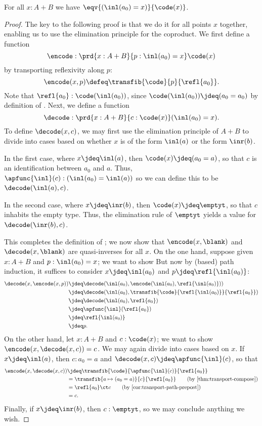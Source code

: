 \begin{thm}\label{thm:path-coprod}
  For all $x:A+B$ we have $\eqv{(\inl(a_0)=x)}{\code(x)}$.
\end{thm}
\begin{proof}
  The key to the following proof is that we do it for all points $x$ together, enabling us to use the elimination principle for the coproduct.
  We first define a function
  \[ \encode : \prd{x:A+B}{p:\inl(a_0)=x} \code(x) \]
  by transporting reflexivity along $p$:
  \[ \encode(x,p) \defeq \transfib{\code}{p}{\refl{a_0}}. \]
  Note that $\refl{a_0} : \code(\inl(a_0))$, since $\code(\inl(a_0))\jdeq (a_0=a_0)$ by definition of \code.
  Next, we define a function
  \[ \decode : \prd{x:A+B}{c:\code(x)} (\inl(a_0)=x). \]
  To define $\decode(x,c)$, we may first use the elimination principle of $A+B$ to divide into cases based on whether $x$ is of the form $\inl(a)$ or the form $\inr(b)$.

  In the first case, where $x\jdeq \inl(a)$, then $\code(x)\jdeq (a_0=a)$, so that $c$ is an identification between $a_0$ and $a$.
  Thus, $\apfunc{\inl}(c):(\inl(a_0)=\inl(a))$ so we can define this to be $\decode(\inl(a),c)$.

  In the second case, where $x\jdeq \inr(b)$, then $\code(x)\jdeq \emptyt$, so that $c$ inhabits the empty type.
  Thus, the elimination rule of $\emptyt$ yields a value for $\decode(\inr(b),c)$.

  This completes the definition of \decode; we now show that $\encode(x,{\blank})$ and $\decode(x,{\blank})$ are quasi-inverses for all $x$.
  On the one hand, suppose given $x:A+B$ and $p:\inl(a_0)=x$; we want to show
  But now by (based) path induction, it suffices to consider $x\jdeq\inl(a_0)$ and $p\jdeq \refl{\inl(a_0)}$:
  \begin{align*}
    \decode(x,\encode(x,p))
    &\jdeq \decode(\inl(a_0),\encode(\inl(a_0),\refl{\inl(a_0)}))\\
    &\jdeq \decode(\inl(a_0),\transfib{\code}{\refl{\inl(a_0)}}{\refl{a_0}})\\
    &\jdeq \decode(\inl(a_0),\refl{a_0})\\
    &\jdeq \apfunc{\inl}(\refl{a_0})\\
    &\jdeq \refl{\inl(a_0)}\\
    &\jdeq p.
  \end{align*}
  On the other hand, let $x:A+B$ and $c:\code(x)$; we want to show $\encode(x,\decode(x,c))=c$.
  We may again divide into cases based on $x$.
  If $x\jdeq\inl(a)$, then $c:a_0=a$ and $\decode(x,c)\jdeq \apfunc{\inl}(c)$, so that
  \begin{align}
    \encode(x,\decode(x,c))
    &\jdeq \transfib{\code}{\apfunc{\inl}(c)}{\refl{a_0}}
    \notag\\
    &= \transfib{a\mapsto (a_0=a)}{c}{\refl{a_0}}
    \tag{by \cref{thm:transport-compose}}\\
    &= \refl{a_0} \ct c
    \tag{by \cref{cor:transport-path-prepost}}\\
    &= c. \notag
  \end{align}
  Finally, if $x\jdeq \inr(b)$, then $c:\emptyt$, so we may conclude anything we wish.
\end{proof}

